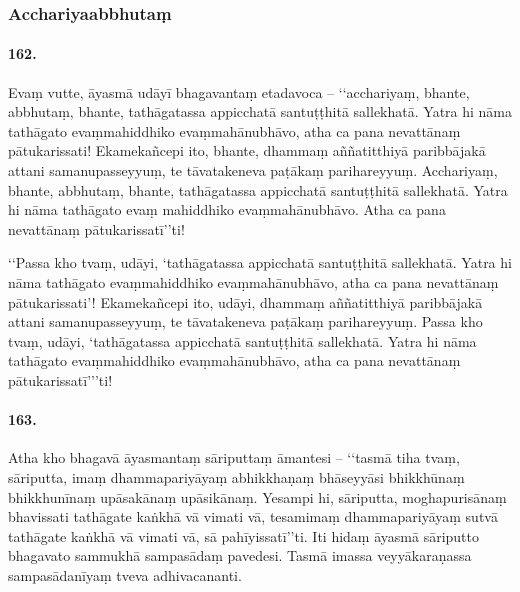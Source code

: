 \subsubsection{Acchariyaabbhutaṃ}

\paragraph{162.} Evaṃ vutte, āyasmā udāyī bhagavantaṃ etadavoca – ‘‘acchariyaṃ, bhante, abbhutaṃ, bhante, tathāgatassa appicchatā santuṭṭhitā sallekhatā. Yatra hi nāma tathāgato evaṃmahiddhiko evaṃmahānubhāvo, atha ca pana nevattānaṃ pātukarissati! Ekamekañcepi ito, bhante, dhammaṃ aññatitthiyā paribbājakā attani samanupasseyyuṃ, te tāvatakeneva paṭākaṃ parihareyyuṃ. Acchariyaṃ, bhante, abbhutaṃ, bhante, tathāgatassa appicchatā santuṭṭhitā sallekhatā. Yatra hi nāma tathāgato evaṃ mahiddhiko evaṃmahānubhāvo. Atha ca pana nevattānaṃ pātukarissatī’’ti!

‘‘Passa kho tvaṃ, udāyi, ‘tathāgatassa appicchatā santuṭṭhitā sallekhatā. Yatra hi nāma tathāgato evaṃmahiddhiko evaṃmahānubhāvo, atha ca pana nevattānaṃ pātukarissati’! Ekamekañcepi ito, udāyi, dhammaṃ aññatitthiyā paribbājakā attani samanupasseyyuṃ, te tāvatakeneva paṭākaṃ parihareyyuṃ. Passa kho tvaṃ, udāyi, ‘tathāgatassa appicchatā santuṭṭhitā sallekhatā. Yatra hi nāma tathāgato evaṃmahiddhiko evaṃmahānubhāvo, atha ca pana nevattānaṃ pātukarissatī’’’ti!

\paragraph{163.} Atha kho bhagavā āyasmantaṃ sāriputtaṃ āmantesi – ‘‘tasmā tiha tvaṃ, sāriputta, imaṃ dhammapariyāyaṃ abhikkhaṇaṃ bhāseyyāsi bhikkhūnaṃ bhikkhunīnaṃ upāsakānaṃ upāsikānaṃ. Yesampi hi, sāriputta, moghapurisānaṃ bhavissati tathāgate kaṅkhā vā vimati vā, tesamimaṃ dhammapariyāyaṃ sutvā tathāgate kaṅkhā vā vimati vā, sā pahīyissatī’’ti. Iti hidaṃ āyasmā sāriputto bhagavato sammukhā sampasādaṃ pavedesi. Tasmā imassa veyyākaraṇassa sampasādanīyaṃ tveva adhivacananti.

